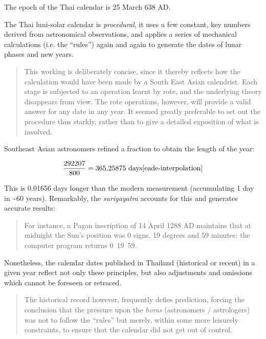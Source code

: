 \documentclass[11pt,oneside]{memoir-article}
\begin{document}
The epoch of the Thai calendar is 25 March 638 AD.

The Thai luni-solar calendar is \emph{procedural}, it uses a few constant,
key numbers derived from astronomical observations, and applies a
series of mechanical calculations (i.e. the ``rules'') again and again
to generate the dates of lunar phases and new years.

\begin{quote}
This working is deliberately concise, since it thereby reflects how
the calculation would have been made by a South East Asian calendrist.
Each stage is subjected to an operation learnt by rote, and the
underlying theory disappears from view. The rote operations, however,
will provide a valid answer for any date in any year. It seemed
greatly preferable to set out the procedure thus starkly, rather than
to give a detailed exposition of what is involved.\cite{eade-interpolation}
\end{quote}

Southeast Asian astronomers refined a fraction to obtain the length of
the year:

\begin{equation}
\frac{292207}{800} = 365.25875\ \text{days}\cite{eade-interpolation}
\end{equation}

This is 0.01656 days longer than the modern measurement (accumulating
1 day in \textasciitilde{}60 years). Remarkably, the \emph{suriyayatra} accounts for this
and generates accurate results:

\begin{quote}
For instance, a Pagan inscription of 14 April 1288 AD maintains that
at midnight the Sun's position was 0 signs, 19 degrees and 59 minutes:
the computer program returns
0~19~59.\cite{eade-calendrical}
\end{quote}

Nonetheless, the calendar dates published in Thailand (historical or
recent) in a given year reflect not only these principles, but also
adjustments and omissions which cannot be foreseen or retraced.

\begin{quote}
The historical record however, frequently defies prediction, forcing
the conclusion that the pressure upon the \emph{horas} (astronomers /
astrologers) was not to follow the ``rules'' but merely, within some
more leisurely constraints, to ensure that the calendar did not get
out of control.\cite{eade-calendrical}
\end{quote}
\end{document}

